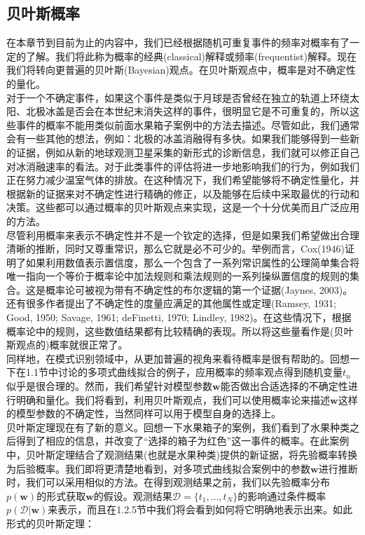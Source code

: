 \documentclass[b5paper]{book}
\numberwithin{equation}{chapter}
\begin{document}
	\subsection{贝叶斯概率}
	\textnormal{在本章节到目前为止的内容中，我们已经根据随机可重复事件的频率对概率有了一定的了解。我们将此称为概率的经典(classical)解释或频率(frequentist)解释。现在我们将转向更普遍的贝叶斯(Bayesian)观点。在贝叶斯观点中，概率是对不确定性的量化。\\
	\indent 对于一个不确定事件，如果这个事件是类似于月球是否曾经在独立的轨道上环绕太阳、北极冰盖是否会在本世纪末消失这样的事件，很明显它是不可重复的，所以这些事件的概率不能用类似前面水果箱子案例中的方法去描述。尽管如此，我们通常会有一些其他的想法，例如：北极的冰盖消融得有多快。如果我们能够得到一些新的证据，例如从新的地球观测卫星采集的新形式的诊断信息，我们就可以修正自己对冰消融速率的看法。对于此类事件的评估将进一步地影响我们的行为，例如我们正在努力减少温室气体的排放。在这种情况下，我们希望能够将不确定性量化，并根据新的证据来对不确定性进行精确的修正，以及能够在后续中采取最优的行动和决策。这些都可以通过概率的贝叶斯观点来实现，这是一个十分优美而且广泛应用的方法。\\
	\indent 尽管利用概率来表示不确定性并不是一个钦定的选择，但是如果我们希望做出合理清晰的推断，同时又尊重常识，那么它就是必不可少的。举例而言，Cox(1946)证明了如果利用数值表示置信度，那么一个包含了一系列常识属性的公理简单集合将唯一指向一个等价于概率论中加法规则和乘法规则的一系列操纵置信度的规则的集合。这是概率论可被视为带有不确定性的布尔逻辑的第一个证据(Jaynes, 2003)。还有很多作者提出了不确定性的度量应满足的其他属性或定理(Ramsey, 1931; Good, 1950; Savage, 1961; deFinetti, 1970; Lindley, 1982)。在这些情况下，根据概率论中的规则，这些数值结果都有比较精确的表现。所以将这些量看作是(贝叶斯观点的)概率就很正常了。\\
	\indent 同样地，在模式识别领域中，从更加普遍的视角来看待概率是很有帮助的。回想一下在1.1节中讨论的多项式曲线拟合的例子，应用概率的频率观点得到随机变量$t_n$似乎是很合理的。然而，我们希望针对模型参数$\mathbf{w}$能否做出合适选择的不确定性进行明确和量化。我们将看到，利用贝叶斯观点，我们可以使用概率论来描述$\mathbf{w}$这样的模型参数的不确定性，当然同样可以用于模型自身的选择上。\\
	\indent 贝叶斯定理现在有了新的意义。回想一下水果箱子的案例，我们看到了水果种类之后得到了相应的信息，并改变了“选择的箱子为红色”这一事件的概率。在此案例中，贝叶斯定理结合了观测结果(也就是水果种类)提供的新证据，将先验概率转换为后验概率。我们即将更清楚地看到，对多项式曲线拟合案例中的参数$\mathbf{w}$进行推断时，我们可以采用相似的方法。在得到观测结果之前，我们以先验概率分布$p(\mathbf{w})$的形式获取$\mathbf{w}$的假设。观测结果$\mathcal{D}=\{t_1,...,t_N\}$的影响通过条件概率$p(\mathcal{D}|\mathbf{w})$来表示，而且在1.2.5节中我们将会看到如何将它明确地表示出来。如此形式的贝叶斯定理：
}
\end{document}
